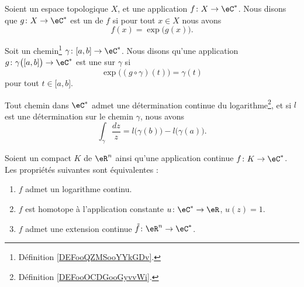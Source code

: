\begin{definition}
    Soient un espace topologique \( X\), et une application \( f\colon X\to \eC^*\). Nous disons que \( g\colon X\to \eC^*\) est un  de \( f\) si pour tout \( x\in X\) nous avons
    \begin{equation}
        f(x)=\exp\big( g(x) \big).
    \end{equation}
\end{definition}

\begin{definition}     \label{DEFooOCDGooGyvvWi}
    Soit un chemin\footnote{Définition \ref{DEFooQZMSooYYkGDv}.} \( \gamma\colon \mathopen[ a , b \mathclose]\to \eC^*\). Nous disons qu'une application \( g\colon \gamma\big( \mathopen[ a , b \mathclose] \big)\to \eC^*\) est une  sur \( \gamma\) si
    \begin{equation}
        \exp\big( (g\circ\gamma)(t) \big)=\gamma(t)
    \end{equation}
    pour tout \( t\in \mathopen[ a , b \mathclose]\).
\end{definition}

\begin{theorem}     \label{THOooUPANooMiECqe}
    Tout chemin dans \( \eC^*\) admet une détermination continue du logarithme\footnote{Définition \ref{DEFooOCDGooGyvvWi}.}, et si \( l\) est une détermination sur le chemin \( \gamma\), nous avons
    \begin{equation}
        \int_{\gamma}\frac{ dz }{ z }=l\big( \gamma(b) \big)-l\big( \gamma(a) \big).
    \end{equation}
\end{theorem}

\begin{theorem}     \label{THOooTCUMooEByCKg}
    Soient un compact \( K\) de \( \eR^n\) ainsi qu'une application continue \( f\colon K\to \eC^*\). Les propriétés suivantes sont équivalentes :
    \begin{enumerate}
        \item   \label{ITEMooKZYDooKoEEbl}
            \( f\) admet un logarithme continu.
        \item   \label{ITEMooXVNXooVAHklr}
            \( f\) est homotope à l'application constante \( u\colon \eC^*\to \eR\), \( u(z)=1\).
        \item   \label{ITEMooQDHXooObjxLA}
            \( f\) admet une extension continue \( \tilde f\colon \eR^n\to \eC^*\).
    \end{enumerate}
\end{theorem}


